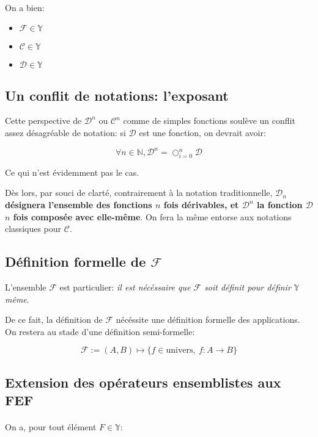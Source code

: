 \documentclass{article}
\newcommand{\Y}{{\mathbb Y}}
\newcommand{\N}{{\mathbb N}}
\newcommand{\cC}{{\mathcal C}}
\newcommand{\cD}{{\mathcal D}}
\newcommand{\cF}{{\mathcal F}}
\begin{document}
\paragraph{}
On a bien:

\begin{itemize}
	\item $\cF \in \Y$
	\item $\cC \in \Y$
	\item $\cD \in \Y$
\end{itemize}



\subsection{Un conflit de notations: l'exposant}

Cette perspective de $\cD^n$ ou $\cC^n$ comme de simples fonctions soulève un conflit assez désagréable de notation: si $\cD$ est une fonction, on devrait avoir:

\[
	\forall n \in \N, \cD^n = \bigcirc_{i=0}^n \cD
\] 

Ce qui n'est évidemment pas le cas.

Dès lors, par souci de clarté, contrairement à la notation traditionnelle, {\bf $\cD_n$ désignera l'ensemble des fonctions $n$ fois dérivables, et $\cD^n$ la fonction $\cD$ $n$ fois composée avec elle-même}. On fera la même entorse aux notations classiques pour $\cC$.

\subsection{Définition formelle de $\cF$}
\label{formal_def_F}

L'ensemble $\cF$ est particulier: \emph{il est nécéssaire que $\cF$ soit définit pour définir $\Y$ même}.

De ce fait, la définition de $\cF$ nécéssite une définition formelle des applications.
On restera au stade d'une définition semi-formelle:

\[
	\cF := (A, B) \mapsto \{ f \in \text{univers},\ f:A\to B\} 
\]

\subsection{Extension des opérateurs ensemblistes aux FEF}

\paragraph{}
On a, pour tout élément $F \in \Y$:
\end{document}
